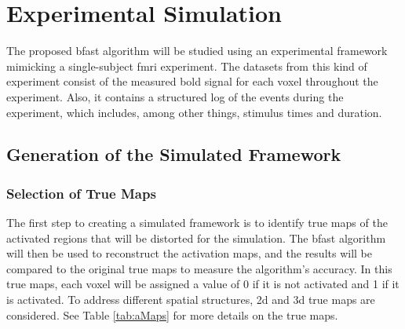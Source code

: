 \chapter{Experimental Simulation}  

The proposed \gls{bfast} algorithm will be studied using an experimental framework mimicking a single-subject \gls{fmri} experiment. The datasets from this kind of experiment consist of the measured \gls{bold} signal for each voxel throughout the experiment. Also, it contains a structured log of the events during the experiment, which includes, among other things, stimulus times and duration. 

\section{Generation of the Simulated Framework}

\subsection{Selection of True Maps}

The first step to creating a simulated framework is to identify true maps of the activated regions that will be distorted for the simulation. The \gls{bfast} algorithm will then be used to reconstruct the activation maps, and the results will be compared to the original true maps to measure the algorithm's accuracy. In this true maps, each voxel will be assigned a value of 0 if it is not activated and 1 if it is activated. To address different spatial structures, \gls{2d} and \gls{3d} true maps are considered. See Table \ref{tab:aMaps} for more details on the true maps.

